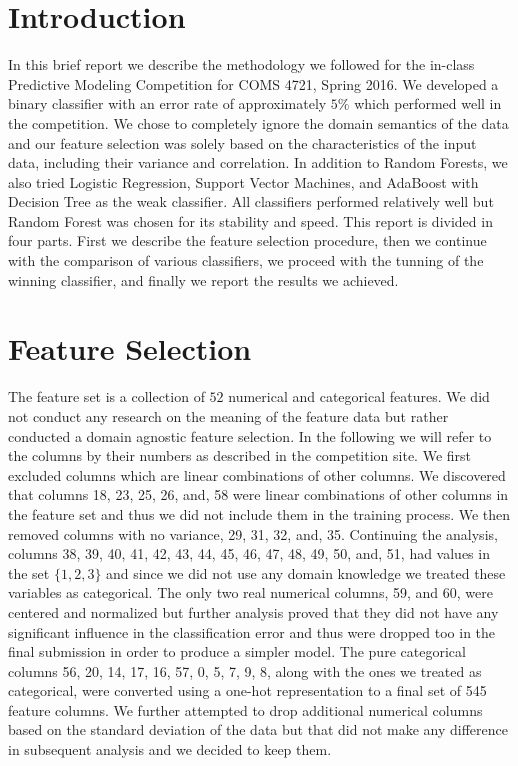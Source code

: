 \documentclass[twoside,11pt]{homework}
\begin{document}
\maketitle

\section*{Introduction}

In this brief report we describe the methodology we followed for the in-class Predictive Modeling Competition for COMS 4721, Spring 2016. We developed a binary classifier with an error rate of approximately $5\%$ which performed well in the competition. We chose to completely ignore the domain semantics of the data and our feature selection was solely based on the
characteristics of the input data, including their variance and correlation. In addition to Random Forests, we also tried Logistic Regression, Support Vector Machines, and AdaBoost with Decision Tree as the weak classifier. All classifiers performed relatively well but Random Forest was chosen for its stability and speed. This report is divided in four parts. First we describe the feature selection procedure, then we continue with the comparison of various classifiers, we proceed with the tunning of the winning classifier, and finally we report the results we achieved. 


\section*{Feature Selection}


The feature set is a collection of $52$ numerical and categorical features. We did not conduct any research on the meaning of the feature data but rather conducted a domain agnostic feature selection. In the following we will refer to the columns by their numbers as described in the competition site. We first excluded columns which are linear combinations of other columns. We discovered that columns 18, 23, 25, 26, and, 58 were linear combinations of other columns in the feature set and thus we did not include them in the training process. We then removed columns with no variance, 29, 31, 32, and, 35. Continuing the analysis, columns 38, 39, 40, 41, 42, 43, 44, 45, 46, 47, 48, 49, 50, and, 51, had values in the set $\{1,2,3\}$ and since we did not use any domain knowledge we treated these variables as categorical. The only two real numerical columns, 59, and 60,  were centered and normalized but further analysis proved that they did not have any significant influence in the classification error and thus were dropped too in the final submission in order to produce a simpler model. The pure categorical columns 56, 20, 14, 17, 16, 57, 0, 5, 7, 9, 8, along with the ones we treated as categorical, were converted using a one-hot representation to a final set of 545 feature columns. We further attempted to drop additional numerical columns based on the standard deviation of the data but that did not make any difference in subsequent analysis and we decided to keep them.
\end{document}
